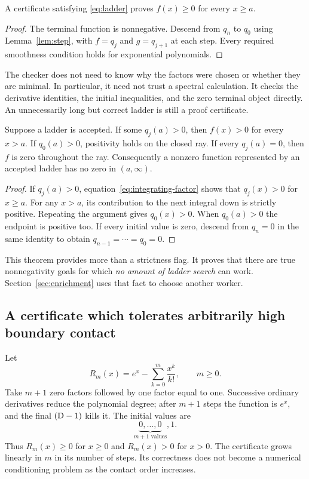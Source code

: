 \begin{theorem}
\label{thm:ladder}
A certificate satisfying \eqref{eq:ladder} proves $f(x)\ge0$ for every $x\ge a$.
\end{theorem}
\begin{proof}
The terminal function is nonnegative. Descend from $q_n$ to $q_0$ using
Lemma~\ref{lem:step}, with $f=q_j$ and $g=q_{j+1}$ at each step.
Every required smoothness condition holds for exponential polynomials.
\end{proof}

The checker does not need to know why the factors were chosen or whether they
are minimal. In particular, it need not trust a spectral calculation. It
checks the derivative identities, the initial inequalities, and the zero
terminal object directly. An unnecessarily long but correct ladder is still a
proof certificate.

\begin{theorem}
\label{thm:strict}
Suppose a ladder is accepted. If some $q_j(a)>0$, then $f(x)>0$ for every $x>a$.
If $q_0(a)>0$, positivity holds on the closed ray. If every $q_j(a)=0$, then
$f$ is zero throughout the ray. Consequently a nonzero function represented by
an accepted ladder has no zero in $(a,\infty)$.
\end{theorem}
\begin{proof}
If $q_j(a)>0$, equation~\eqref{eq:integrating-factor} shows that $q_j(x)>0$
for $x\ge a$. For any $x>a$, its contribution to the next integral down is
strictly positive. Repeating the argument gives $q_0(x)>0$. When $q_0(a)>0$
the endpoint is positive too. If every initial value is zero, descend from
$q_n=0$ in the same identity to obtain $q_{n-1}=\cdots=q_0=0$.
\end{proof}

This theorem provides more than a strictness flag. It proves that there are
true nonnegativity goals for which \emph{no amount of ladder search} can work.
Section~\ref{sec:enrichment} uses that fact to choose another worker.

\subsection{A certificate which tolerates arbitrarily high boundary contact}

Let
\[
 R_m(x)=e^x-\sum_{k=0}^m\frac{x^k}{k!},\qquad m\ge0.
\]
Take $m+1$ zero factors followed by one factor equal to one. Successive ordinary
derivatives reduce the polynomial degree; after $m+1$ steps the function is
$e^x$, and the final $(\mathrm D-1)$ kills it. The initial values are
\[
 \underbrace{0,\ldots,0}_{m+1\text{ values}},1.
\]
Thus $R_m(x)\ge0$ for $x\ge0$ and $R_m(x)>0$ for $x>0$. The certificate grows
linearly in $m$ in its number of steps. Its correctness does not become a
numerical conditioning problem as the contact order increases.

